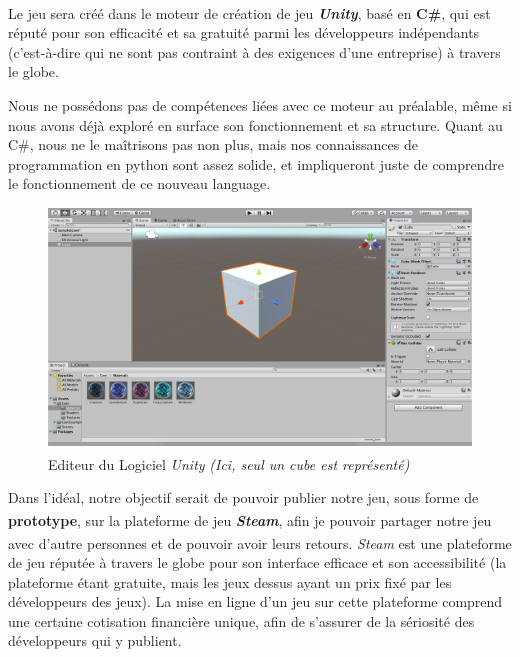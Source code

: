\documentclass{article}
\def\reg{\small{\textsuperscript{\textregistered}}}
\begin{document}
Le jeu sera créé dans le moteur de création de jeu \textbf{\textit{Unity\reg}}, basé en \textbf{C\#}, qui est réputé pour son efficacité et sa gratuité parmi les développeurs indépendants (c'est-à-dire qui ne sont pas contraint à des exigences d'une entreprise) à travers le globe.

Nous ne possédons pas de compétences liées avec ce moteur au préalable, même si nous avons déjà exploré en surface son fonctionnement et sa structure. Quant au C\#, nous ne le maîtrisons pas non plus, mais nos connaissances de programmation en python sont assez solide, et impliqueront juste de comprendre le fonctionnement de ce nouveau language.

    \begin{figure}[h]
        \centering
            \includegraphics[scale=0.2]{image_unity_editor.png}
            \caption{Editeur du Logiciel \textit{Unity\reg} \textit{(Ici, seul un cube est représenté)}}
            \label{fig:x photosysteme}
    \end{figure}

Dans l'idéal, notre objectif serait de pouvoir publier notre jeu, sous forme de \textbf{prototype}, sur la plateforme de jeu \textbf{\textit{Steam\reg}}, afin je pouvoir partager notre jeu avec d'autre personnes et de pouvoir avoir leurs retours. \textit{Steam\reg} est une plateforme de jeu réputée à travers le globe pour son interface efficace et son accessibilité (la plateforme étant gratuite, mais les jeux dessus ayant un prix fixé par les développeurs des jeux). La mise en ligne d'un jeu sur cette plateforme comprend une certaine cotisation financière unique, afin de s'assurer de la sériosité des développeurs qui y publient.
\end{document}
